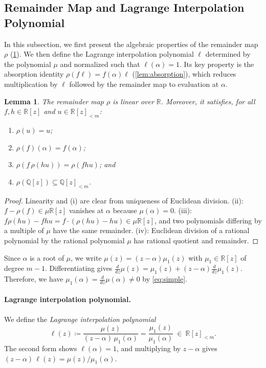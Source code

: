 \documentclass[11pt, a4paper]{article}
\theoremstyle{plain}
\newtheorem{lemma}{Lemma}
\theoremstyle{definition}
\newcommand{\Q}{\mathbb{Q}}
\newcommand{\R}{\mathbb{R}}
\newcommand{\PP}{\R[z]_{<m}}
\newcommand{\PQ}{\Q[z]_{<m}}
\newcommand{\defas}{\coloneqq}
\begin{document}
\subsection{Remainder Map and Lagrange Interpolation Polynomial}

In this subsection, we first present the algebraic properties of the remainder map $\rho$ (\cref{lem:rho}). We then define the Lagrange interpolation polynomial $\ell$ determined by the polynomial $\mu$ and normalized such that $\ell(\alpha)=1$.
Its key property is the absorption identity $\rho(f\ell)=f(\alpha)\ell$ (\cref{lem:absorption}), which reduces multiplication by $\ell$ followed by the remainder map to evaluation at $\alpha$.

\begin{lemma}\label{lem:rho}
The remainder map $\rho$ is linear over $\R$. Moreover, it satisfies, for all $f,h\in\R[z]$ and $u\in\PP$:
\begin{enumerate}
\item[\emph{(i)}] $\rho(u)=u$;
\item[\emph{(ii)}] $\rho(f)(\alpha)=f(\alpha)$;
\item[\emph{(iii)}] $\rho(f\,\rho(hu))=\rho(fhu)$; and
\item[\emph{(iv)}] $\rho(\Q[z])\subseteq\PQ$.
\end{enumerate}
\end{lemma}

\begin{proof}
Linearity and (i) are clear from uniqueness of Euclidean division. (ii): $f-\rho(f)\in\mu\R[z]$ vanishes at $\alpha$ because $\mu(\alpha)=0$. (iii): $f\rho(hu)-fhu=f\cdot(\rho(hu)-hu)\in\mu\R[z]$, and two polynomials differing by a multiple of $\mu$ have the same remainder. (iv): Euclidean division of a rational polynomial by the rational polynomial $\mu$ has rational quotient and remainder.
\end{proof}

Since $\alpha$ is a root of $\mu$, we write $\mu(z)=(z-\alpha)\mu_1(z)$ with $\mu_1\in\R[z]$ of degree $m-1$. Differentiating gives $\frac{d}{dz} \mu(z)=\mu_1(z)+(z-\alpha)\frac{d}{dz} \mu_1(z)$. Therefore, we have $\mu_1(\alpha)=\frac{d}{dz} \mu(\alpha) \neq0$ by \cref{eq:simple}.

\paragraph{Lagrange interpolation polynomial.} We define the \emph{Lagrange interpolation polynomial}
\begin{equation}\label{eq:lagrange}
\ell(z)\defas \frac{\mu(z)}{(z-\alpha)\,\mu_1(\alpha)}=\frac{\mu_1(z)}{\mu_1(\alpha)}\ \in\ \PP .
\end{equation}
The second form shows $\ell(\alpha)=1$, and multiplying by $z-\alpha$ gives $(z-\alpha)\,\ell(z)=\mu(z)/\mu_1(\alpha)$.
\end{document}
